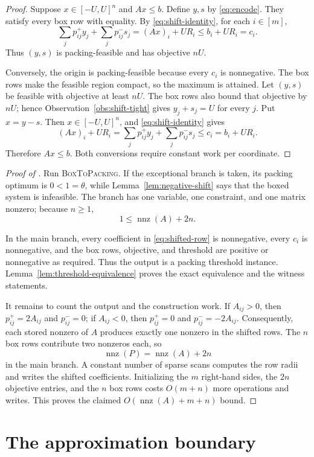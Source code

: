 \documentclass[11pt]{article}
\theoremstyle{remark}
\newcommand{\nnz}{\operatorname{nnz}}
\begin{document}
\begin{proof}
Suppose $x\in[-U,U]^n$ and $Ax\leq b$.  Define $y,s$ by
\eqref{eq:encode}.  They satisfy every box row with equality.  By
\eqref{eq:shift-identity}, for each $i\in[m]$,
\[
  \sum_jp^+_{ij}y_j+\sum_jp^-_{ij}s_j
  =(Ax)_i+UR_i
  \leq b_i+UR_i=c_i.
\]
Thus $(y,s)$ is packing-feasible and has objective $nU$.

Conversely, the origin is packing-feasible because every $c_i$ is
nonnegative.  The box rows make the feasible region compact, so the
maximum is attained.  Let $(y,s)$ be feasible with objective at least
$nU$.  The box rows also bound that objective by $nU$; hence
Observation~\ref{obs:shift-tight} gives $y_j+s_j=U$ for every $j$.  Put
$x=y-s$.  Then $x\in[-U,U]^n$, and
\eqref{eq:shift-identity} gives
\[
  (Ax)_i+UR_i
  =\sum_jp^+_{ij}y_j+\sum_jp^-_{ij}s_j
  \leq c_i=b_i+UR_i.
\]
Therefore $Ax\leq b$.  Both conversions require constant work per
coordinate.
\end{proof}

\begin{proof}[Proof of ]
Run \textsc{BoxToPacking}.  If the exceptional branch is taken, its
packing optimum is $0<1=\theta$, while
Lemma~\ref{lem:negative-shift} says that the boxed system is infeasible.
The branch has one variable, one constraint, and one matrix nonzero;
because $n\geq1$,
\[
  1\leq\nnz(A)+2n.
\]

In the main branch, every coefficient in
\eqref{eq:shifted-row} is nonnegative, every $c_i$ is nonnegative, and
the box rows, objective, and threshold are positive or nonnegative as
required.  Thus the output is a packing threshold instance.
Lemma~\ref{lem:threshold-equivalence} proves the exact equivalence and the
witness statements.

It remains to count the output and the construction work.  If
$A_{ij}>0$, then $p^+_{ij}=2A_{ij}$ and $p^-_{ij}=0$; if
$A_{ij}<0$, then $p^+_{ij}=0$ and $p^-_{ij}=-2A_{ij}$.  Consequently,
each stored nonzero of $A$ produces exactly one nonzero in the shifted
rows.  The $n$ box rows contribute two nonzeros each, so
\[
  \nnz(P)=\nnz(A)+2n
\]
in the main branch.  A constant number of sparse scans computes the
row radii and writes the shifted coefficients.  Initializing the $m$
right-hand sides, the $2n$ objective entries, and the $n$ box rows
costs $O(m+n)$ more operations and writes.  This proves the claimed
$O(\nnz(A)+m+n)$ bound.
\end{proof}

\section{The approximation boundary}
\label{sec:approximation-boundary}
\end{document}

